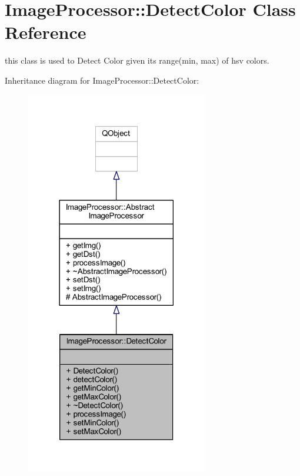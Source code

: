 \hypertarget{class_image_processor_1_1_detect_color}{}\section{Image\+Processor\+:\+:Detect\+Color Class Reference}
\label{class_image_processor_1_1_detect_color}


this class is used to Detect Color given it\textquotesingle{}s range(min, max) of hsv colors.  




Inheritance diagram for Image\+Processor\+:\+:Detect\+Color\+:\nopagebreak
\begin{figure}[H]
\begin{center}
\leavevmode
\includegraphics[width=225pt]{d2/d7f/class_image_processor_1_1_detect_color__inherit__graph}
\end{center}
\end{figure}


